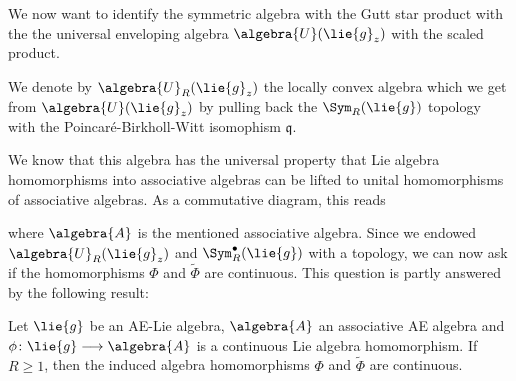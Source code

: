 We now want to identify the symmetric algebra with the Gutt star product with 
the the universal enveloping algebra $\algebra{U}(\lie{g}_z)$ with the scaled 
product.
\begin{definition}
	We denote by $\algebra{U}_R(\lie{g}_z)$ the locally convex algebra which we 
	get from $\algebra{U}(\lie{g}_z)$ by pulling back the $\Sym_R(\lie{g})$ 
	topology with the Poincar\'e-Birkholl-Witt isomophism $\mathfrak{q}$.
\end{definition}
We know that this algebra has the universal property that Lie algebra 
homomorphisms into associative algebras can be lifted to unital homomorphisms 
of associative algebras. As a commutative diagram, this reads
\begin{center}
\end{center}
where $\algebra{A}$ is the mentioned associative algebra. Since we endowed 
$\algebra{U}_R(\lie{g}_z)$ and $\Sym_R^{\bullet}(\lie{g})$ with a topology, we 
can now ask if the homomorphisms $\Phi$ and $\widetilde{\Phi}$ are continuous. 
This question is partly answered by the following result:
\begin{proposition}
    \label{LCAna:Prop:Semi-functoriality}%
    Let $\lie{g}$ be an AE-Lie algebra, $\algebra{A}$ an associative
    AE algebra and $\phi \colon \lie{g} \longrightarrow \algebra{A}$
    is a continuous Lie algebra homomorphism.  If $R \geq 1$, then the
    induced algebra homomorphisms $\Phi$ and $\widetilde{\Phi}$ are
    continuous.
\end{proposition}

